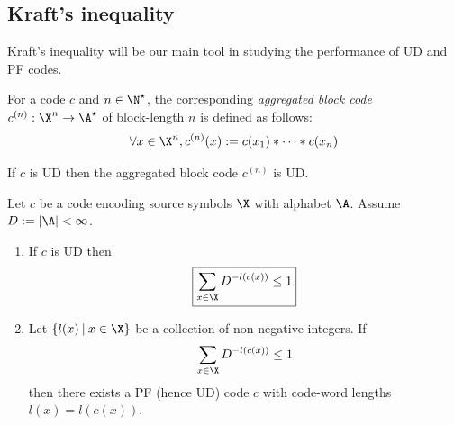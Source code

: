 \documentclass[toc, titlepaged]{../cs-classes/cs-classes}
\begin{document}
\subsection{Kraft's inequality}
Kraft's inequality will be our main tool in studying the performance of UD and PF codes.

\begin{definition}
    For a code $c$ and $n\in \N^\star$, the corresponding \emph{aggregated block code} $c^{(n)} : \X^n\to \A^\star$ of block-length $n$ is defined as follows:
    \begin{equation*}
        \forall x\in \X^n, c^{(n)}(x) := c(x_1) * \dots * c(x_n)
    \end{equation*}
\end{definition}

\begin{lemma}
    If $c$ is UD then the aggregated block code $c^{(n)}$ is UD.
\end{lemma}


\begin{theorem}
    Let $c$ be a code encoding source symbols $\X$ with alphabet $\A$. Assume $D:=|\A|<\infty$. 
    \begin{enumerate}
        \item If $c$ is UD then
        \begin{equation}
            \label{eq:kraft-ineq}
            \boxed{\sum_{x\in\X} D^{-l(c(x))}\leq 1}
        \end{equation}

        \item Let $\{l(x)\:|\:x\in\X\}$ be a collection of non-negative integers. If
        \begin{equation*}
            \sum_{x\in\X} D^{-l(c(x))}\leq 1
        \end{equation*}
        then there exists a PF (hence UD) code $c$ with code-word lengths $l(x)=l(c(x))$.
    \end{enumerate}
\end{theorem}
\end{document}
